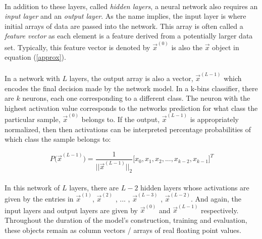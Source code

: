 \documentclass[12pt,letterpaper]{article}
\begin{document}
\paragraph*{}In addition to these layers, called \textit{hidden layers}, a neural network also requires an \textit{input layer} and an \textit{output layer}\cite{Goodfellow}. As the name implies, the input layer is where initial arrays of data are passed into the network. This array is often called a \textit{feature vector} as each element is a feature derived from a potentially larger data set. Typically, this feature vector is denoted by 
$\vec{x}^{(0)}$ is also the $\vec{x}$ object in equation (\ref{approx}). 

\paragraph*{}In a network with $L$ layers, the output array is also a vector, 
$\vec{x}^{(L-1)}$ which encodes the final decision made by the network model. In a k-bins classifier, there are $k$ neurons, each one corresponding to a different class. The neuron with the highest activation value corresponds to the networks prediction for what class the particular sample, 
$\vec{x}^{(0)}$ belongs to. If the output, $\vec{x}^{(L-1)}$ is appropriately normalized, then then activations can be interpreted percentage probabilities of which class the sample belongs to:

\begin{equation}
\label{probability}
P \big( \vec{x}^{(L-1)} \big) = \frac{1}{||\vec{x}^{(L-1)}||_2} \big[ x_0 , x_1 , x_2 , ... , x_{k-2} , x_{k-1} \big]^T
\end{equation}

\paragraph*{}In this network of $L$ layers, there are $L-2$ hidden layers whose activations are given by the entries in $\vec{x}^{(1)}$, 
$\vec{x}^{(2)}$ , ... , $\vec{x}^{(L-3)}$ , $\vec{x}^{(L-2)}$. And again, the input layers and output layers are given by $\vec{x}^{(0)}$ and 
$\vec{x}^{(L-1)}$ respectively. Throughout the duration of the model's construction, training and evaluation, these objects remain as column vectors / arrays of real floating point values.

\pagebreak

\end{document}
